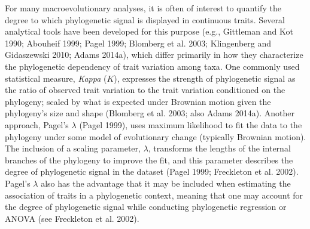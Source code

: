 \documentclass[
]{article}
\begin{document}
For many macroevolutionary analyses, it is often of interest to quantify
the degree to which phylogenetic signal is displayed in continuous
traits. Several analytical tools have been developed for this purpose
(e.g., Gittleman and Kot 1990; Abouheif 1999; Pagel 1999; Blomberg et
al. 2003; Klingenberg and Gidaszewski 2010; Adams 2014a), which differ
primarily in how they characterize the phylogenetic dependency of trait
variation among taxa. One commonly used statistical measure,
\emph{Kappa} (\(K\)), expresses the strength of phylogenetic signal as
the ratio of observed trait variation to the trait variation conditioned
on the phylogeny; scaled by what is expected under Brownian motion given
the phylogeny's size and shape (Blomberg et al. 2003; also Adams 2014a).
Another approach, Pagel's \(\lambda\) (Pagel 1999), uses maximum
likelihood to fit the data to the phylogeny under some model of
evolutionary change (typically Brownian motion). The inclusion of a
scaling parameter, \(\lambda\), transforms the lengths of the internal
branches of the phylogeny to improve the fit, and this parameter
describes the degree of phylogenetic signal in the dataset (Pagel 1999;
Freckleton et al. 2002). Pagel's \(\lambda\) also has the advantage that
it may be included when estimating the association of traits in a
phylogenetic context, meaning that one may account for the degree of
phylogenetic signal while conducting phylogenetic regression or ANOVA
(see Freckleton et al. 2002). \hfill\break
\end{document}
